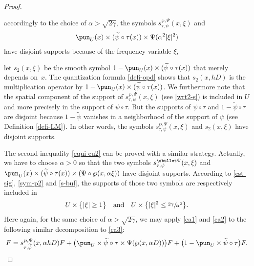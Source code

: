 \begin{proof}
\begin{enumeratei}
\item accordingly to the choice of $\alpha>\sqrt{2\gamma}$, the symbols $s_{\tau,\psi}^{\wp,\Psi}(x,\xi)$ and
\begin{equation*}\pun_U(x)\times (\widetilde{\psi}\circ \tau(x))\times \Psi(\alpha^2 |\xi|^2)
\end{equation*}
have disjoint supports because of the frequency variable $\xi$,
\item let $s_2(x,\xi)$ be the smooth symbol $1-\pun_{U}(x)\times (\widetilde{\psi}\circ \tau(x))$ that merely depends on~$x$. The quantization formula \eqref{defi-opd} shows that $s_2(x,hD)$ is the multiplication operator by $1-\pun_{U}(x)\times (\widetilde{\psi}\circ \tau(x))$. We furthermore note that the spatial component of the support of $s_{\tau,\psi}^{\wp,\Psi}(x,\xi)$ (see \eqref{wrt2-s}) is included in $U$ and more precisely in the support of $\psi\circ \tau$.
But the supports of $\psi\circ \tau$ and $1-\widetilde{\psi}\circ \tau$ are disjoint because $1-\widetilde{\psi}$ vanishes in a neighborhood of the support of $\psi$ (see Definition \ref{defi-LM}). In other words, the symbols $s_{\tau,\psi}^{\wp,\Psi}(x,\xi)$ and $s_2(x,\xi)$ have disjoint supports.
\end{enumeratei}

The second inequality \eqref{equi-eu2} can be proved with a similar strategy. Actually, we have to choose $\alpha>0$ so that the two symbols $s_{\tau,\psi}^{\sbullet\Psi}(x,\xi)$ and $\pun_{U}(x)\times (\widetilde{\psi}\circ \tau(x)) \times (\Psi\circ \wp(x,\alpha \xi))$ have disjoint supports.
According to \eqref{est-sig}, \eqref{sym-p2} and \eqref{s-bul}, the supports of those two symbols are respectively included in
\begin{equation*}
U\times \bigl\{|\xi|\geq 1 \bigr\} \quad \text{and}\quad U\times \bigl\{|\xi|^2\leq \sfrac{2\gamma}{\alpha^2}\bigr\}.
\end{equation*}
Here again, for the same choice of $\alpha>\sqrt{2\gamma}$, we may apply \eqref{ca1} and \eqref{ca2} to the following similar decomposition to \eqref{ca3}:
\begin{equation*}
F=s_{\tau,\widetilde{\psi}}^{\wp,\Psi}(x,\alpha h D)F+
\bigl(\pun_{U}\times \widetilde{\psi}\circ \tau \times \Psi(\wp(x,\alpha D)) \bigr)F+\bigl(1-\pun_{U}\times \widetilde{\psi}\circ \tau \bigr)F.\qedhere
\end{equation*}
\end{proof}

